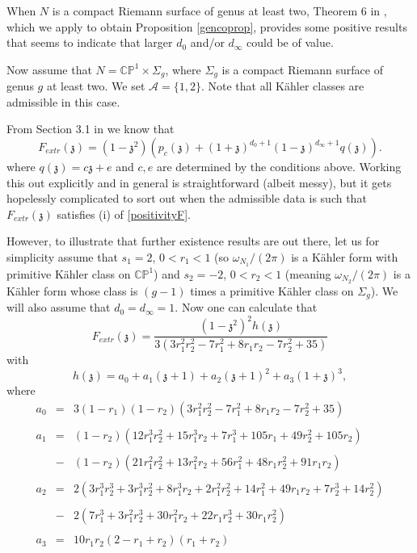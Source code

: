 \documentclass[12pt]{amsart}
\def\bbc{{\mathbb C}}
\def\bbp{{\mathbb P}}
\def\cala{{\mathcal A}}
\def\gz{{\mathfrak z}}
\begin{document}
When $N$ is a compact Riemann surface of genus at least two, Theorem 6 in \cite{ACGT08}, which we apply to obtain Proposition \ref{gencoprop}, provides some positive results that seems to indicate that larger $d_0$ and/or $d_\infty$ could be of value. 

Now assume that $N=\bbc\bbp^1\times \Sigma_g$, where $\Sigma_g$ is a compact Riemann surface of genus $g$ at least two. 
We set $\cala =\{1,2\}$. Note that all K\"ahler classes are admissible in this case.

From Section 3.1 in \cite{ACGT08} we know that
$$F_{extr}(\gz)= (1-\gz^2)\left( p_c(\gz) + (1+\gz)^{d_0+1}(1-\gz)^{d_\infty+1} q(\gz)\right).$$
where $q(\gz)=c\gz+e$ and $c,e$ are determined by
the conditions above. 
Working this out explicitly and in general is straightforward (albeit messy), but it gets hopelessly complicated to sort out when the admissible data is such that $F_{extr}(\gz)$ satisfies (i) of \eqref{positivityF}. 

However, to illustrate that further existence results are out there, let us for simplicity assume that $s_1=2$, $0<r_1<1$ (so $\omega_{N_1}/(2\pi)$ is a K\"ahler form with primitive K\"ahler class on $\bbc\bbp^1$) and  $s_2=-2$, $0<r_2<1$ (meaning $\omega_{N_2}/(2\pi)$ is a K\"ahler form whose class is $(g-1)$ times a primitive K\"ahler class on $\Sigma_g$). We will also assume that $d_0=d_\infty=1$. 
Now one can calculate that
$$F_{extr}(\gz)= \frac{(1-\gz^2)^2h(\gz)}{3 \left(3 r_1^2 r_2^2-7 r_1^2+8 r_1 r_2-7 r_2^2+35\right)}$$
with
$$
h(\gz) = a_0 + a_1(\gz+1) + a_2 (\gz+1)^2 + a_3 (1+\gz)^3,
$$
where
\tiny
$$
\begin{array}{ccl}
a_0 
 &=&   3 (1-r_1) (1-r_2) \left(3 r_1^2 r_2^2-7 r_1^2+8 r_1 r_2-7 r_2^2+35\right)\\
\\
a_1 &=&  (1-r_2)\left(12 r_1^3 r_2^2+15 r_1^3 r_2+7 r_1^3 +105 r_1+49 r_2^2+105 r_2\right)\\
\\
& -&  (1-r_2)\left(21 r_1^2 r_2^2+13 r_1^2 r_2+56 r_1^2+48 r_1 r_2^2+91 r_1 r_2\right)\\
\\
a_2 &=& 2 \left(3 r_1^3 r_2^3+3 r_1^3 r_2^2+8 r_1^3 r_2+2 r_1^2 r_2^2
+14 r_1^2+49 r_1 r_2 +7 r_2^3+14 r_2^2\right) \\
\\
&-& 2\left(7 r_1^3+3 r_1^2 r_2^3+30 r_1^2 r_2
+22 r_1 r_2^3+30 r_1 r_2^2\right) \\
\\
a_3 &=& 10 r_1 r_2 (2-r_1+r_2) (r_1+r_2)
\end{array}
$$
\normalsize
\end{document}
